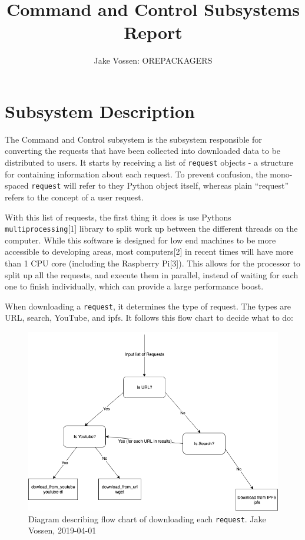\documentclass{article}
\begin{document}
\title{Command and Control Subsystems Report}
\author{Jake Vossen: OREPACKAGERS}

\maketitle


\section{Subsystem Description}
The Command and Control subsystem is the subsystem responsible for
converting the requests that have been collected into downloaded data
to be distributed to users. It starts by receiving a list of
\texttt{request} objects - a structure for containing information about
each request. To prevent confusion, the mono-spaced \texttt{request}
will refer to they Python object itself, whereas plain ``request''
refers to the concept of a user request.

With this list of requests, the first thing it does is use Pythons
\texttt{multiprocessing}[1] library to split work up between the
different threads on the computer. While this software is designed
for low end machines to be more accessible to developing areas, most
computers[2] in recent times will have more than 1 CPU core (including
the Raspberry Pi[3]). This allows for the processor to split up all
the requests, and execute them in parallel, instead of waiting for each
one to finish individually, which can provide a large performance
boost.

When downloading a \texttt{request}, it determines the type of
request. The types are URL, search, YouTube, and ipfs. It follows this
flow chart to decide what to do:

\begin{figure}[h]
  \centering
  \includegraphics[scale=.6]{log-flow-chart.png}
  \caption{\begingroup \fontsize{10pt}{12pt}\selectfont Diagram describing flow chart of downloading each
    \texttt{request}. Jake Vossen, 2019-04-01 \endgroup}
\end{figure}
\end{document}
